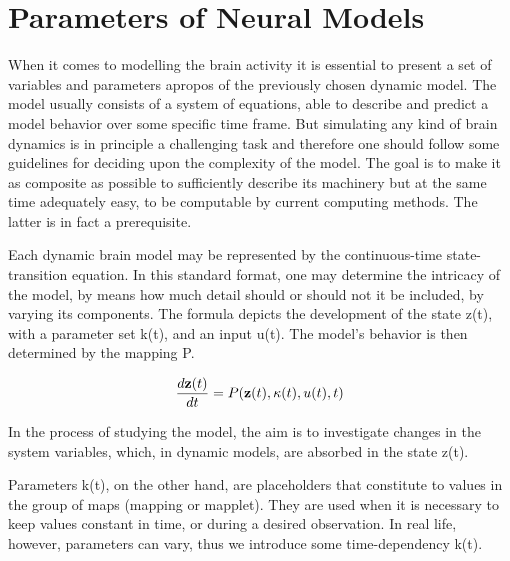 \documentclass[../../Orator]{subfiles}
\begin{document}
 
\section{Parameters of Neural Models}

When it comes to modelling the brain activity it is essential to present a set of variables and parameters apropos of the previously chosen dynamic model. The model usually consists of a system of equations, able to describe and predict a model behavior over some specific time frame. But simulating any kind of brain dynamics is in principle a challenging task and therefore one should follow some guidelines for deciding upon the complexity of the model. The goal is to make it as composite as possible to sufficiently describe its machinery but at the same time adequately easy, to be computable by current computing methods. The latter is in fact a prerequisite. 

Each dynamic brain model may be represented by the continuous-time state-transition equation. In this standard format, one may determine the intricacy of the model, by means how much detail should or should not it be included, by varying its components. The formula depicts the development of the state z(t), with a parameter set k(t), and an input u(t). The model’s behavior is then determined by the mapping P. 

\begin{equation}
    \frac{d\mathbf{z}(t)}{dt} = P(\mathbf{z}(t), \kappa(t), u(t),t)
\end{equation}

In the process of studying the model, the aim is to investigate changes in the system variables, which, in dynamic models, are absorbed in the state z(t). 

Parameters k(t), on the other hand, are placeholders that constitute to values in the group of maps (mapping or mapplet). They are used when it is necessary to keep values constant in time, or during a desired observation. In real life, however, parameters can vary, thus we introduce some time-dependency k(t). 
\end{document}
